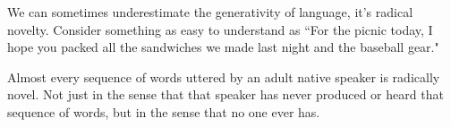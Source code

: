 We can sometimes underestimate the generativity of language, it's radical novelty. Consider something as easy to understand as ``For the picnic today, I hope you packed all the sandwiches we made last night and the baseball gear."

Almost every sequence of words uttered by an adult native speaker is radically novel. Not just in the sense that that speaker has never produced or heard that sequence of words, but in the sense that no one ever has.

